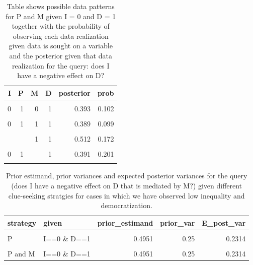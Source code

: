 \documentclass[
  12pt,
]{book}
\begin{document}
\begin{table}

\caption{\label{tab:pimdposs}Table shows possible data patterns for P and M given I = 0 and D = 1 together with the probability of observing each data realization given data is sought on a variable and the posterior given that data realization for the query: does I have a negative effect on D?}
\centering
\begin{tabular}[t]{rrrrrr}
\toprule
I & P & M & D & posterior & prob\\
\midrule
\cellcolor{gray!6}{0} & \cellcolor{gray!6}{0} & \cellcolor{gray!6}{0} & \cellcolor{gray!6}{1} & \cellcolor{gray!6}{0.667} & \cellcolor{gray!6}{0.044}\\
0 & 1 & 0 & 1 & 0.393 & 0.102\\
\cellcolor{gray!6}{0} & \cellcolor{gray!6}{0} & \cellcolor{gray!6}{1} & \cellcolor{gray!6}{1} & \cellcolor{gray!6}{0.679} & \cellcolor{gray!6}{0.073}\\
0 & 1 & 1 & 1 & 0.389 & 0.099\\
\cellcolor{gray!6}{0} & \cellcolor{gray!6}{} & \cellcolor{gray!6}{0} & \cellcolor{gray!6}{1} & \cellcolor{gray!6}{0.475} & \cellcolor{gray!6}{0.146}\\
\addlinespace
0 &  & 1 & 1 & 0.512 & 0.172\\
\cellcolor{gray!6}{0} & \cellcolor{gray!6}{0} & \cellcolor{gray!6}{} & \cellcolor{gray!6}{1} & \cellcolor{gray!6}{0.674} & \cellcolor{gray!6}{0.117}\\
0 & 1 &  & 1 & 0.391 & 0.201\\
\cellcolor{gray!6}{0} & \cellcolor{gray!6}{} & \cellcolor{gray!6}{} & \cellcolor{gray!6}{1} & \cellcolor{gray!6}{0.495} & \cellcolor{gray!6}{0.318}\\
\bottomrule
\end{tabular}
\end{table}

\begin{table}

\caption{\label{tab:pimdlearnpriorseffect}Prior estimand, prior variances and expected posterior variances for the query (does I have a negative effect on D that is mediated by M?) given different  clue-seeking  stratgies for cases in which we have observed low inequality and democratization.}
\centering
\begin{tabular}[t]{llrrr}
\toprule
strategy & given & prior\_estimand & prior\_var & E\_post\_var\\
\midrule
\cellcolor{gray!6}{None} & \cellcolor{gray!6}{I==0 \& D==1} & \cellcolor{gray!6}{0.4951} & \cellcolor{gray!6}{0.25} & \cellcolor{gray!6}{0.2500}\\
P & I==0 \& D==1 & 0.4951 & 0.25 & 0.2314\\
\cellcolor{gray!6}{M} & \cellcolor{gray!6}{I==0 \& D==1} & \cellcolor{gray!6}{0.4951} & \cellcolor{gray!6}{0.25} & \cellcolor{gray!6}{0.2496}\\
P and M & I==0 \& D==1 & 0.4951 & 0.25 & 0.2314\\
\bottomrule
\end{tabular}
\end{table}
\end{document}
